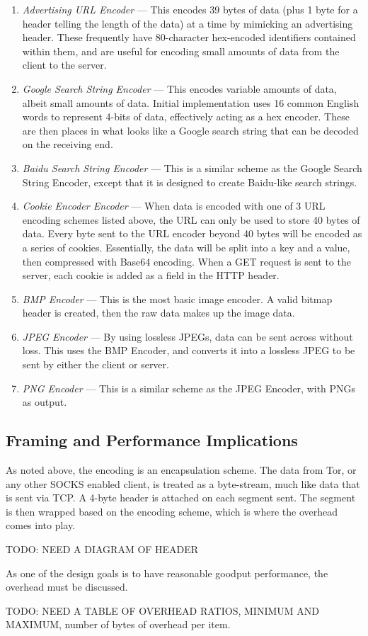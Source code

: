\begin{enumerate}
  \item \emph{Advertising URL Encoder} --- This encodes 39 bytes of data (plus 1 byte for a header telling the length of the data) at a time by mimicking an advertising header. These frequently have 80-character hex-encoded identifiers contained within them, and are useful for encoding small amounts of data from the client to the server.
  \item \emph{Google Search String Encoder} --- This encodes variable amounts of data, albeit small amounts of data. Initial implementation uses 16 common English words to represent 4-bits of data, effectively acting as a hex encoder. These are then places in what looks like a Google search string that can be decoded on the receiving end.
  \item \emph{Baidu Search String Encoder} --- This is a similar scheme as the Google Search String Encoder, except that it is designed to create Baidu-like search strings.
  \item \emph{Cookie Encoder Encoder} --- When data is encoded with one of 3 URL encoding schemes listed above, the URL can only be used to store 40 bytes of data. Every byte sent to the URL encoder beyond 40 bytes will be encoded as a series of cookies. Essentially, the data will be split into a key and a value, then compressed with Base64 encoding. When a GET request is sent to the server, each cookie is added as a field in the HTTP header.
  \item \emph{BMP Encoder} --- This is the most basic image encoder. A valid bitmap header is created, then the raw data makes up the image data.
  \item \emph{JPEG Encoder} --- By using lossless JPEGs, data can be sent across without loss. This uses the BMP Encoder, and converts it into a lossless JPEG to be sent by either the client or server.
  \item \emph{PNG Encoder} --- This is a similar scheme as the JPEG Encoder, with PNGs as output.
\end{enumerate}

\subsection{Framing and Performance Implications}
As noted above, the encoding is an encapsulation scheme. The data from Tor, or any other SOCKS enabled client, is treated as a byte-stream, much like data that is sent via TCP. A 4-byte header is attached on each segment sent. The segment is then wrapped based on the encoding scheme, which is where the overhead comes into play.


TODO: NEED A DIAGRAM OF HEADER


As one of the design goals is to have reasonable goodput performance, the overhead must be discussed. 


TODO: NEED A TABLE OF OVERHEAD RATIOS, MINIMUM AND MAXIMUM, number of bytes of overhead per item.
